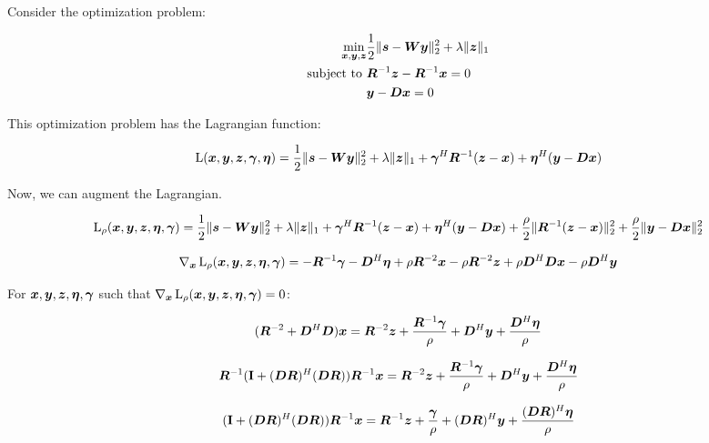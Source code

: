 \documentclass{article}
\begin{document}
Consider the optimization problem:

\begin{equation}
\begin{aligned}
\min_{\bm{x},\bm{y},\bm{z}} & \frac{1}{2}\|\bm{s} - \bm{W}\bm{y}\|_2^2 + \lambda\|\bm{z}\|_1 \\
\text{subject to } & \bm{R}^{-1}\bm{z} - \bm{R}^{-1}\bm{x} = 0 \\
                   & \bm{y} -\bm{D}\bm{x} = 0
\end{aligned}
\end{equation}

This optimization problem has the Lagrangian function:

\begin{equation}
\operatorname{L}(\bm{x},\bm{y},\bm{z},\bm{\gamma},\bm{\eta}) = \frac{1}{2}\|\bm{s} - \bm{W}\bm{y}\|_2^2 + \lambda\|\bm{z}\|_1 + \bm{\gamma}^H\bm{R}^{-1}(\bm{z} - \bm{x}) + \bm{\eta}^H(\bm{y} - \bm{D}\bm{x})
\end{equation}

Now, we can augment the Lagrangian.

\begin{equation}
\operatorname{L}_{\rho}(\bm{x},\bm{y},\bm{z},\bm{\eta},\bm{\gamma}) = \frac{1}{2}\|\bm{s} - \bm{W}\bm{y}\|_2^2 + \lambda\|\bm{z}\|_1 + \bm{\gamma}^H\bm{R}^{-1}(\bm{z} - \bm{x}) + \bm{\eta}^H(\bm{y} - \bm{D}\bm{x}) + \frac{\rho}{2}\|\bm{R}^{-1}(\bm{z} - \bm{x})\|_2^2 + \frac{\rho}{2}\|\bm{y} - \bm{D}\bm{x}\|_2^2
\end{equation}

\begin{equation}
\nabla_{\bm{x}}\operatorname{L}_{\rho}(\bm{x},\bm{y},\bm{z},\bm{\eta},\bm{\gamma}) = -\bm{R}^{-1}\bm{\gamma} - \bm{D}^H\bm{\eta} + \rho\bm{R}^{-2}\bm{x} - \rho\bm{R}^{-2}\bm{z} + \rho\bm{D}^H\bm{D}\bm{x} - \rho\bm{D}^H\bm{y}
\end{equation}

For $\bm{x},\bm{y},\bm{z},\bm{\eta},\bm{\gamma}$ such that $\nabla_{\bm{x}}\operatorname{L}_{\rho}(\bm{x},\bm{y},\bm{z},\bm{\eta},\bm{\gamma}) = 0$:

\begin{equation}
(\bm{R}^{-2} + \bm{D}^H\bm{D})\bm{x} = \bm{R}^{-2}\bm{z} + \frac{\bm{R}^{-1} \bm{\gamma}}{\rho} + \bm{D}^H\bm{y} + \frac{\bm{D}^H\bm{\eta}}{\rho}
\end{equation}

\begin{equation}
\bm{R}^{-1}({\bf I} + (\bm{D}\bm{R})^H(\bm{D}\bm{R}))\bm{R}^{-1}\bm{x} = \bm{R}^{-2}\bm{z} + \frac{\bm{R}^{-1} \bm{\gamma}}{\rho} + \bm{D}^H\bm{y} + \frac{\bm{D}^H\bm{\eta}}{\rho}
\end{equation}

\begin{equation}
({\bf I} + (\bm{D}\bm{R})^H(\bm{D}\bm{R}))\bm{R}^{-1}\bm{x} = \bm{R}^{-1}\bm{z} + \frac{\bm{\gamma}}{\rho} + (\bm{D}\bm{R})^H\bm{y} + \frac{(\bm{D}\bm{R})^H\bm{\eta}}{\rho}
\end{equation}
\end{document}

